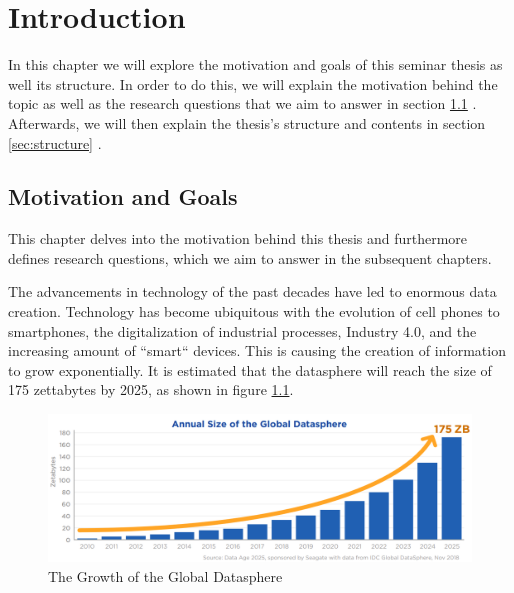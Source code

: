 \chapter{Introduction}
\label{cha:Introduction} %

In this chapter we will explore the motivation and goals of this seminar thesis as well its structure.
In order to do this, we will explain the motivation behind the topic as well as the research questions that we aim to answer in section \ref{sec:motivation-goals} .
Afterwards, we will then explain the thesis's structure and contents in section \ref{sec:structure} .

\section{Motivation and Goals}
\label{sec:motivation-goals}

This chapter delves into the motivation behind this thesis and furthermore defines research questions, which we aim to answer in the subsequent chapters.

\quad The advancements in technology of the past decades have led to enormous data creation. Technology has become ubiquitous 
with the evolution of cell phones to smartphones, the digitalization of industrial processes, Industry 4.0,
and the increasing amount of ``smart`` devices. This is causing the creation of information to grow exponentially.
It is estimated that the \gls{datasphere} will reach the size of 175 zettabytes by 2025, as shown in figure \ref{fig:growth_datasphere}.
\begin{figure}[ht]
\centering
\includegraphics[width=1.0\textwidth]{Bilder/size_global_datasphere.png}
\caption{The Growth of the Global Datasphere \cite[p. 6]{idc-seagate-data}}
\label{fig:growth_datasphere}
\end{figure}

